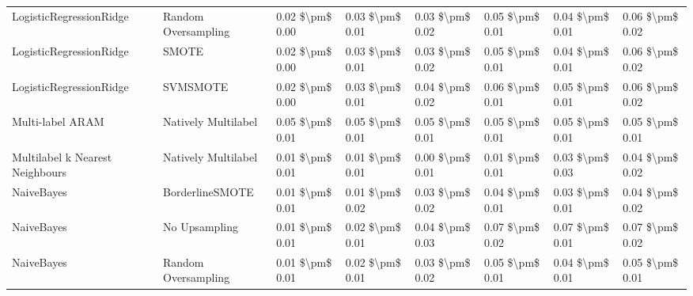 \begin{tabular}{llllllll}
        LogisticRegressionRidge &           Random Oversampling & 0.02 \$\textbackslash pm\$ 0.00 &           0.03 \$\textbackslash pm\$ 0.01 &       0.03 \$\textbackslash pm\$ 0.02 &        0.05 \$\textbackslash pm\$ 0.01 &                         0.04 \$\textbackslash pm\$ 0.01 &     0.06 \$\textbackslash pm\$ 0.02 \\
        LogisticRegressionRidge &                         SMOTE & 0.02 \$\textbackslash pm\$ 0.00 &           0.03 \$\textbackslash pm\$ 0.01 &       0.03 \$\textbackslash pm\$ 0.02 &        0.05 \$\textbackslash pm\$ 0.01 &                         0.04 \$\textbackslash pm\$ 0.01 &     0.06 \$\textbackslash pm\$ 0.02 \\
        LogisticRegressionRidge &                      SVMSMOTE & 0.02 \$\textbackslash pm\$ 0.00 &           0.03 \$\textbackslash pm\$ 0.01 &       0.04 \$\textbackslash pm\$ 0.02 &        0.06 \$\textbackslash pm\$ 0.01 &                         0.05 \$\textbackslash pm\$ 0.01 &     0.06 \$\textbackslash pm\$ 0.02 \\
               Multi-label ARAM &           Natively Multilabel & 0.05 \$\textbackslash pm\$ 0.01 &           0.05 \$\textbackslash pm\$ 0.01 &       0.05 \$\textbackslash pm\$ 0.01 &        0.05 \$\textbackslash pm\$ 0.01 &                         0.05 \$\textbackslash pm\$ 0.01 &     0.05 \$\textbackslash pm\$ 0.01 \\
Multilabel k Nearest Neighbours &           Natively Multilabel & 0.01 \$\textbackslash pm\$ 0.01 &           0.01 \$\textbackslash pm\$ 0.01 &       0.00 \$\textbackslash pm\$ 0.01 &        0.01 \$\textbackslash pm\$ 0.01 &                         0.03 \$\textbackslash pm\$ 0.03 &     0.04 \$\textbackslash pm\$ 0.02 \\
                     NaiveBayes &               BorderlineSMOTE & 0.01 \$\textbackslash pm\$ 0.01 &           0.01 \$\textbackslash pm\$ 0.02 &       0.03 \$\textbackslash pm\$ 0.02 &        0.04 \$\textbackslash pm\$ 0.01 &                         0.03 \$\textbackslash pm\$ 0.01 &     0.04 \$\textbackslash pm\$ 0.02 \\
                     NaiveBayes &                 No Upsampling & 0.01 \$\textbackslash pm\$ 0.01 &           0.02 \$\textbackslash pm\$ 0.01 &       0.04 \$\textbackslash pm\$ 0.03 &        0.07 \$\textbackslash pm\$ 0.02 &                         0.07 \$\textbackslash pm\$ 0.01 &     0.07 \$\textbackslash pm\$ 0.02 \\
                     NaiveBayes &           Random Oversampling & 0.01 \$\textbackslash pm\$ 0.01 &           0.02 \$\textbackslash pm\$ 0.01 &       0.03 \$\textbackslash pm\$ 0.02 &        0.05 \$\textbackslash pm\$ 0.01 &                         0.04 \$\textbackslash pm\$ 0.01 &     0.05 \$\textbackslash pm\$ 0.01 \\

\end{tabular}
